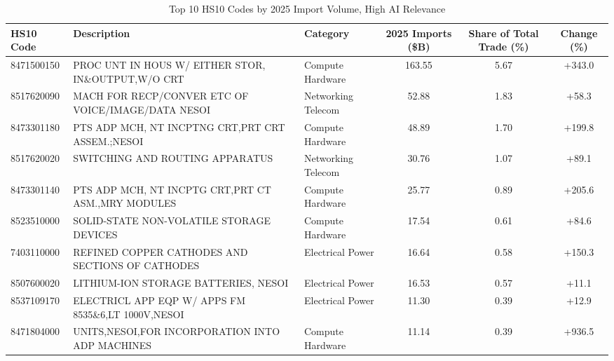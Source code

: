 \begin{table}[htbp]
\centering
\small
\caption{Top 10 HS10 Codes by 2025 Import Volume, High AI Relevance}
\label{tab:top10_high_relevance}
\setlength{\tabcolsep}{1.25mm}
\renewcommand{\arraystretch}{1.80}
\begin{tabular}{lp{5cm}lccc}
\toprule
HS10 Code & Description & Category & 2025 Imports (\$B) & Share of Total Trade (\%) & Change (\%) \\
\midrule
8471500150 & {\footnotesize PROC UNT IN HOUS W/ EITHER STOR, IN\&OUTPUT,W/O CRT} & Compute Hardware & 163.55 & 5.67 & +343.0 \\
8517620090 & {\footnotesize MACH FOR RECP/CONVER ETC OF VOICE/IMAGE/DATA NESOI} & Networking Telecom & 52.88 & 1.83 & +58.3 \\
8473301180 & {\footnotesize PTS ADP MCH, NT INCPTNG CRT,PRT CRT ASSEM.;NESOI} & Compute Hardware & 48.89 & 1.70 & +199.8 \\
8517620020 & {\footnotesize SWITCHING AND ROUTING APPARATUS} & Networking Telecom & 30.76 & 1.07 & +89.1 \\
8473301140 & {\footnotesize PTS ADP MCH, NT INCPTG CRT,PRT CT ASM.,MRY MODULES} & Compute Hardware & 25.77 & 0.89 & +205.6 \\
8523510000 & {\footnotesize SOLID-STATE NON-VOLATILE STORAGE DEVICES} & Compute Hardware & 17.54 & 0.61 & +84.6 \\
7403110000 & {\footnotesize REFINED COPPER CATHODES AND SECTIONS OF CATHODES} & Electrical Power & 16.64 & 0.58 & +150.3 \\
8507600020 & {\footnotesize LITHIUM-ION STORAGE BATTERIES, NESOI} & Electrical Power & 16.53 & 0.57 & +11.1 \\
8537109170 & {\footnotesize ELECTRICL APP EQP W/ APPS FM 8535\&6,LT 1000V,NESOI} & Electrical Power & 11.30 & 0.39 & +12.9 \\
8471804000 & {\footnotesize UNITS,NESOI,FOR INCORPORATION INTO ADP MACHINES} & Compute Hardware & 11.14 & 0.39 & +936.5 \\
\bottomrule
\end{tabular}
\end{table}
